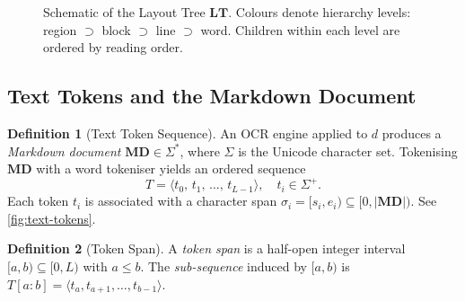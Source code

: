 \documentclass{article}
\theoremstyle{definition}
\newtheorem{definition}{Definition}[section]
\newcommand{\LT}{\mathbf{LT}}
\newcommand{\MD}{\mathbf{MD}}
\begin{document}
\begin{figure}[h]
  \centering
  \caption{Schematic of the Layout Tree $\LT$.  Colours denote hierarchy
    levels: \textcolor{blue!60}{region} $\supset$
    \textcolor{green!60!black}{block} $\supset$
    \textcolor{orange!80!black}{line} $\supset$
    \textcolor{red!60}{word}.
    Children within each level are ordered by reading order.}
  \label{fig:layout-tree}
\end{figure}

\subsection{Text Tokens and the Markdown Document}

\begin{definition}[Text Token Sequence]
  An OCR engine applied to $d$ produces a \emph{Markdown document}
  $\MD \in \Sigma^{*}$, where $\Sigma$ is the Unicode character set.
  Tokenising $\MD$ with a word tokeniser yields an ordered sequence
  \[
    T = \langle t_0,\, t_1,\, \ldots,\, t_{L-1} \rangle,
    \quad t_i \in \Sigma^{+}.
  \]
  Each token $t_i$ is associated with a character span
  $\sigma_i = [s_i, e_i) \subseteq [0, |\MD|)$.
  See \cref{fig:text-tokens}.
\end{definition}

\begin{definition}[Token Span]
  A \emph{token span} is a half-open integer interval
  $[a, b) \subseteq [0, L)$ with $a \le b$.
  The \emph{sub-sequence} induced by $[a,b)$ is
  $T[a:b] = \langle t_a, t_{a+1}, \ldots, t_{b-1} \rangle$.
\end{definition}
\end{document}
